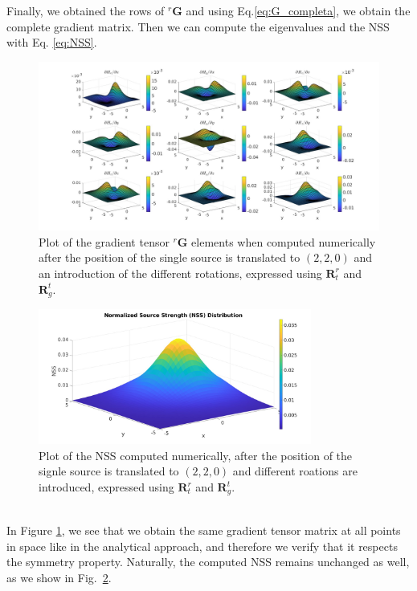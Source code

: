 \noindent
Finally, we obtained the rows of ${}^r \mathbf{G}$ and using Eq.\ref{eq:G_completa}, 
we obtain the complete gradient matrix. Then we can compute the eigenvalues and the NSS
with Eq. \ref{eq:NSS}.

\begin{figure}
\centering
\hspace*{-0.2\textwidth}
\includegraphics[width=1.4\textwidth]{images/gradients_rotated_single_num.jpg}
\caption{Plot of the gradient tensor ${}^r \mathbf{G}$ elements
when computed numerically after the position of the single source is translated to $(2,2,0)$ and an 
introduction of the different rotations, expressed using $\mathbf{R}^r_t$ and $\mathbf{R}_g^t$.}
\label{fig:gradients_rotated_single_num}
\end{figure}
\begin{figure}
\centering
\includegraphics[width=0.8\textwidth]{images/NSS_rotated_single_num.jpg}
\caption{Plot of the NSS computed numerically, after the position of the signle source is translated to $(2,2,0)$ and 
different roations are introduced, expressed using $\mathbf{R}^r_t$ and $\mathbf{R}_g^t$.}
\label{fig:NSS_rotated_single_num}
\end{figure}

\noindent
\\
In Figure \ref{fig:gradients_rotated_single_num}, we see that we obtain the same 
gradient tensor matrix at all points in space like in the analytical approach, and therefore 
we verify that it respects the symmetry property.
Naturally, the computed NSS remains unchanged as well, as we show in Fig.~\ref{fig:NSS_rotated_single_num}.

